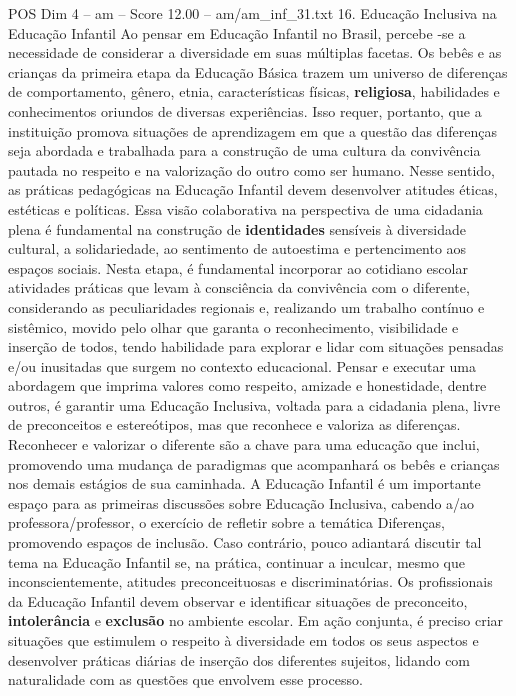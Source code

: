 \begin{textsample}{POS Dim 4 – am – Score 12.00 – am/am\_inf\_31.txt}  \label{ex:f4_pos_104}
16.
Educação Inclusiva na Educação Infantil Ao pensar em Educação Infantil no Brasil, percebe -se a necessidade de considerar a diversidade em suas múltiplas facetas.
Os bebês e as crianças da primeira etapa da Educação Básica trazem um universo de diferenças de comportamento, gênero, etnia, características físicas, \textbf{religiosa}, habilidades e conhecimentos oriundos de diversas experiências.
Isso requer, portanto, que a instituição promova situações de aprendizagem em que a questão das diferenças seja abordada e trabalhada para a construção de uma cultura da convivência pautada no respeito e na valorização do outro como ser humano.
Nesse sentido, as práticas pedagógicas na Educação Infantil devem desenvolver atitudes éticas, estéticas e políticas.
Essa visão colaborativa na perspectiva de uma cidadania plena é fundamental na construção de \textbf{identidades} sensíveis à diversidade cultural, a solidariedade, ao sentimento de autoestima e pertencimento aos espaços sociais.
Nesta etapa, é fundamental incorporar ao cotidiano escolar atividades práticas que levam à consciência da convivência com o diferente, considerando as peculiaridades regionais e, realizando um trabalho contínuo e sistêmico, movido pelo olhar que garanta o reconhecimento, visibilidade e inserção de todos, tendo habilidade para explorar e lidar com situações pensadas e/ou inusitadas que surgem no contexto educacional.
Pensar e executar uma abordagem que imprima valores como respeito, amizade e honestidade, dentre outros, é garantir uma Educação Inclusiva, voltada para a cidadania plena, livre de preconceitos e estereótipos, mas que reconhece e valoriza as diferenças.
Reconhecer e valorizar o diferente são a chave para uma educação que inclui, promovendo uma mudança de paradigmas que acompanhará os bebês e crianças nos demais estágios de sua caminhada.
A Educação Infantil é um importante espaço para as primeiras discussões sobre Educação Inclusiva, cabendo a/ao professora/professor, o exercício de refletir sobre a temática Diferenças, promovendo espaços de inclusão.
Caso contrário, pouco adiantará discutir tal tema na Educação Infantil se, na prática, continuar a inculcar, mesmo que inconscientemente, atitudes preconceituosas e discriminatórias.
Os profissionais da Educação Infantil devem observar e identificar situações de preconceito, \textbf{intolerância} e \textbf{exclusão} no ambiente escolar.
Em ação conjunta, é preciso criar situações que estimulem o respeito à diversidade em todos os seus aspectos e desenvolver práticas diárias de inserção dos diferentes sujeitos, lidando com naturalidade com as questões que envolvem esse processo.

\end{textsample}
